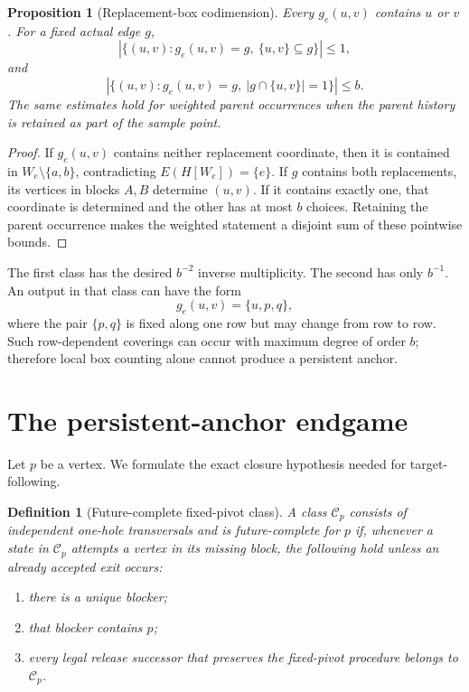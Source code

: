 \documentclass[11pt]{article}
\newtheorem{proposition}[theorem]{Proposition}
\newtheorem{definition}[theorem]{Definition}
\begin{document}
\begin{proposition}[Replacement-box codimension]\label{prop:box}
Every \(g_e(u,v)\) contains \(u\) or \(v\).  For a fixed actual edge \(g\),
\[
\left|\{(u,v):g_e(u,v)=g,\ \{u,v\}\subseteq g\}\right|\le1,
\]
and
\[
\left|\{(u,v):g_e(u,v)=g,\ |g\cap\{u,v\}|=1\}\right|\le b.
\]
The same estimates hold for weighted parent occurrences when the parent
history is retained as part of the sample point.
\end{proposition}

\begin{proof}
If \(g_e(u,v)\) contains neither replacement coordinate, then it is contained
in \(W_e\setminus\{a,b\}\), contradicting
\(E(H[W_e])=\{e\}\).  If \(g\) contains both replacements, its vertices in
blocks \(A,B\) determine \((u,v)\).  If it contains exactly one, that coordinate
is determined and the other has at most \(b\) choices.  Retaining the parent
occurrence makes the weighted statement a disjoint sum of these pointwise
bounds.
\end{proof}

The first class has the desired \(b^{-2}\) inverse multiplicity.  The second
has only \(b^{-1}\).  An output in that class can have the form
\[
  g_e(u,v)=\{u,p,q\},
\]
where the pair \(\{p,q\}\) is fixed along one row but may change from row to
row.  Such row-dependent coverings can occur with maximum degree of order
\(b\); therefore local box counting alone cannot produce a persistent anchor.

\section{The persistent-anchor endgame}

Let \(p\) be a vertex.  We formulate the exact closure hypothesis needed for
target-following.

\begin{definition}[Future-complete fixed-pivot class]
A class \(\mathcal C_p\) consists of independent one-hole transversals and is
future-complete for \(p\) if, whenever a state in \(\mathcal C_p\) attempts a
vertex in its missing block, the following hold unless an already accepted exit
occurs:
\begin{enumerate}[label=(\alph*)]
\item there is a unique blocker;
\item that blocker contains \(p\);
\item every legal release successor that preserves the fixed-pivot procedure
belongs to \(\mathcal C_p\).
\end{enumerate}
\end{definition}
\end{document}
